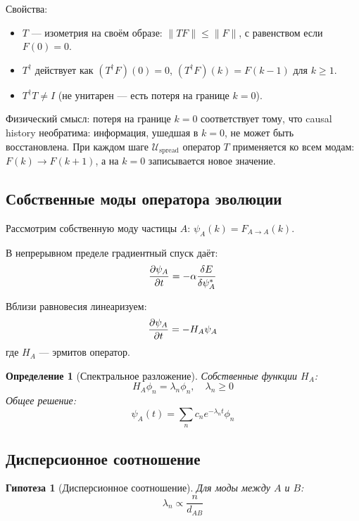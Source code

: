 \documentclass[11pt,a4paper]{article}
\newtheorem{definition}{Определение}[section]
\newtheorem{hypothesis}{Гипотеза}[section]
\theoremstyle{definition}
\begin{document}
Свойства:
\begin{itemize}
    \item $T$ --- изометрия на своём образе: $\|T F\| \leq \|F\|$, с равенством если $F(0) = 0$.
    \item $T^\dagger$ действует как $(T^\dagger F)(0) = 0$, $(T^\dagger F)(k) = F(k-1)$ для $k \geq 1$.
    \item $T^\dagger T \neq I$ (не унитарен --- есть потеря на границе $k=0$).
\end{itemize}

Физический смысл: потеря на границе $k=0$ соответствует тому, что causal history необратима: информация, ушедшая в $k=0$, не может быть восстановлена. При каждом шаге $\mathcal{U}_{\text{spread}}$ оператор $T$ применяется ко всем модам: $F(k) \to F(k+1)$, а на $k=0$ записывается новое значение.

\subsection{Собственные моды оператора эволюции}

Рассмотрим собственную моду частицы $A$: $\psi_A(k) = F_{A \to A}(k)$.

В непрерывном пределе градиентный спуск даёт:
\begin{equation}
    \pdv{\psi_A}{t} = -\alpha \frac{\delta E}{\delta \psi_A^*}
\end{equation}

Вблизи равновесия линеаризуем:
\begin{equation}
    \pdv{\psi_A}{t} = -H_A \psi_A
\end{equation}
где $H_A$ --- эрмитов оператор.

\begin{definition}[Спектральное разложение]
Собственные функции $H_A$:
\begin{equation}
    H_A \phi_n = \lambda_n \phi_n, \quad \lambda_n \geq 0
\end{equation}
Общее решение:
\begin{equation}
    \psi_A(t) = \sum_n c_n e^{-\lambda_n t} \phi_n
\end{equation}
\end{definition}

\subsection{Дисперсионное соотношение}

\begin{hypothesis}[Дисперсионное соотношение]
Для моды между $A$ и $B$:
\begin{equation}
    \lambda_n \propto \frac{n}{d_{AB}}
\end{equation}
\end{hypothesis}
\end{document}

